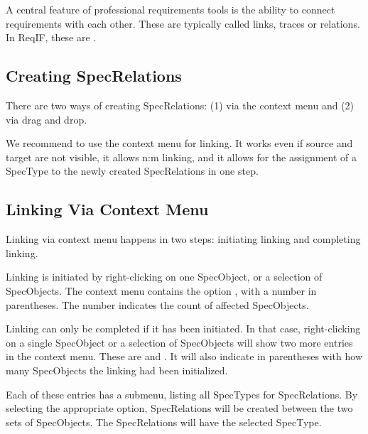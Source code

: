 A central feature of professional requirements tools is the ability to connect requirements with each other.  These are typically called links, traces or relations.  In ReqIF, these are .

\subsection{Creating SpecRelations}

There are two ways of creating SpecRelations: (1) via the context menu and (2) via drag and drop.

\begin{info}
We recommend to use the context menu for linking.  It works even if source and target are not visible, it allows n:m linking, and it allows for the assignment of a SpecType to the newly created SpecRelations in one step.
\end{info}



\subsection{Linking Via Context Menu}

Linking via context menu happens in two steps: initiating linking and completing linking.

Linking is initiated by right-clicking on one SpecObject, or a selection of SpecObjects.  The context menu contains the option , with a number in parentheses. The number indicates the count of affected SpecObjects.

Linking can only be completed if it has been initiated.  In that case, right-clicking on a single SpecObject or a selection of SpecObjects will show two more entries in the context menu.  These are  and .  It will also indicate in parentheses with how many SpecObjects the linking had been initialized.

Each of these entries has a submenu, listing all SpecTypes for SpecRelations.  By selecting the appropriate option, SpecRelations will be created between the two sets of SpecObjects.  The SpecRelations will have the selected SpecType.

